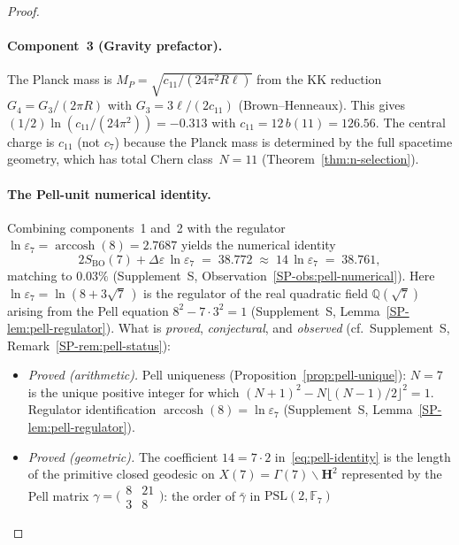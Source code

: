 \begin{proof}
\paragraph{Component~3 (Gravity prefactor).}
The Planck mass is $M_P = \sqrt{c_{11}/(24\pi^2 R\ell)}$
from the KK reduction $G_4 = G_3/(2\pi R)$
with $G_3 = 3\ell/(2c_{11})$ (Brown--Henneaux).
This gives $(1/2)\ln(c_{11}/(24\pi^2)) = -0.313$
with $c_{11} = 12\,b(11) = 126.56$.
The central charge is $c_{11}$ (not $c_7$) because
the Planck mass is determined by the full spacetime geometry,
which has total Chern class~$N = 11$
(Theorem~\ref{thm:n-selection}).

\paragraph{The Pell-unit numerical identity.}
Combining components~1 and~2 with the regulator
$\ln\varepsilon_7 = \operatorname{arccosh}(8) = 2.7687$
yields the numerical identity
\begin{equation}\label{eq:pell-identity}
  2S_{\mathrm{BO}}(7) + \Delta\varepsilon\,\ln\varepsilon_7
  \;=\; 38.772 \;\approx\; 14\,\ln\varepsilon_7 \;=\; 38.761,
\end{equation}
matching to $0.03\%$
(Supplement~S, Observation~\ref*{SP-obs:pell-numerical}).
Here $\ln\varepsilon_7 = \ln(8{+}3\sqrt{7}\,)$ is the
regulator of the real quadratic field $\mathbb{Q}(\sqrt{7})$
arising from the Pell equation $8^2 - 7 \cdot 3^2 = 1$
(Supplement~S, Lemma~\ref*{SP-lem:pell-regulator}).
What is \emph{proved}, \emph{conjectural}, and
\emph{observed} (cf.\ Supplement~S, Remark~\ref*{SP-rem:pell-status}):
\begin{itemize}
\item \emph{Proved (arithmetic).} Pell uniqueness
  (Proposition~\ref{prop:pell-unique}): $N = 7$ is the unique
  positive integer for which $(N{+}1)^2 - N\lfloor(N{-}1)/2\rfloor^2 = 1$.
  Regulator identification $\operatorname{arccosh}(8)
  = \ln\varepsilon_7$ (Supplement~S,
  Lemma~\ref*{SP-lem:pell-regulator}).
\item \emph{Proved (geometric).} The coefficient
  $14 = 7\cdot 2$ in~\eqref{eq:pell-identity} is the length
  of the primitive closed geodesic on $X(7) = \Gamma(7)\backslash
  \mathbf{H}^2$ represented by the Pell matrix
  $\gamma = \bigl(\begin{smallmatrix} 8 & 21 \\ 3 & 8 \end{smallmatrix}\bigr)$:
  the order of $\bar\gamma$ in $\mathrm{PSL}(2,\mathbb{F}_7)$

\end{itemize}
\end{proof}
